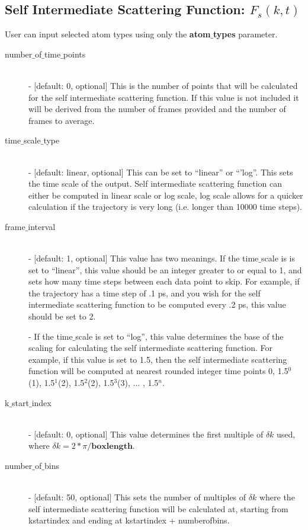 \documentclass{article}
\begin{document}
\subsection{Self Intermediate Scattering Function: $F_s(k,t)$} \label{sec::Fsqt_parm}
User can input selected atom types using only the \textbf{atom$\_$types} parameter.
\begin{description}	
	\item[number$\_$of$\_$time$\_$points]\hfill \\
	- [default: 0, optional] This is the number of points that will be calculated for the self intermediate scattering function.  If this value is not included it will be derived from the number of frames provided and the number of frames to average.
	
	\item[time$\_$scale$\_$type] \hfill \\
	- [default: linear, optional] This can be set to ``linear'' or ``'log''.  This sets the time scale of the output. Self intermediate scattering function can either be computed in linear scale or log scale, log scale allows for a quicker calculation if the trajectory is very long (i.e. longer than 10000 time steps).
	
	\item[frame$\_$interval] \hfill \\
	- [default: 1, optional] This value has two meanings.  If the time$\_$scale is is set to ``linear'', this value should be an integer greater to or equal to 1, and sets how many time steps between each data point to skip.  For example, if the trajectory has a time step of .1 ps, and you wish for the self intermediate scattering function to be computed every .2 ps, this value should be set to 2. 
	
	- If the time$\_$scale is set to ``log'', this value determines the base of the scaling for calculating the self intermediate scattering function.  For example, if this value is set to 1.5, then the self intermediate scattering function will be computed at nearest rounded integer time points 0, 1.5$^0$(1), 1.5$^1$(2), 1.5$^2$(2), 1.5$^3$(3), ... , 1.5$^{n}$.
	
	\item[k$\_$start$\_$index] \hfill \\
	- [default: 0, optional] This value determines the first multiple of $\delta k$ used, where $\delta k = 2*\pi/\textbf{boxlength}$.  
	
	\item[number$\_$of$\_$bins] \hfill \\
	- [default: 50, optional] This sets the number of multiples of $\delta k$ where the self intermediate scattering function will be calculated at, starting from kstartindex and ending at kstartindex + numberofbins. 	
	
\end{description}
\end{document}
